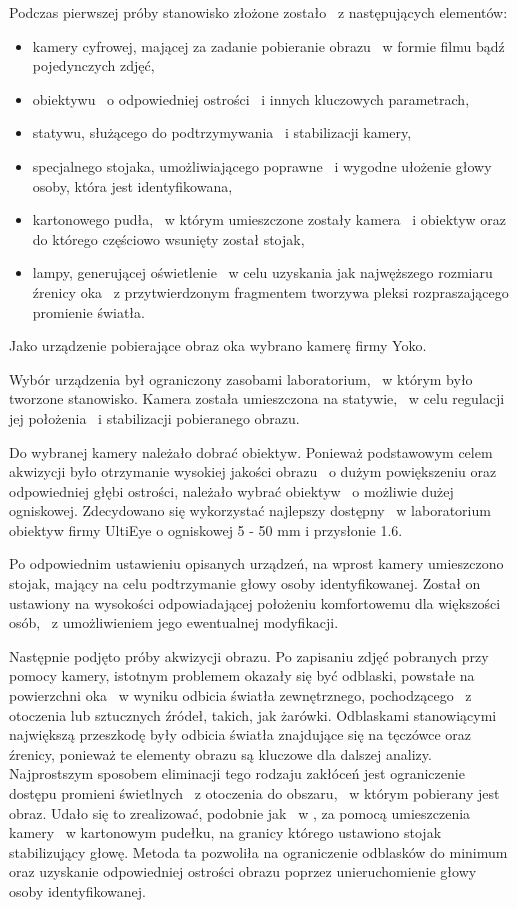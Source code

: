 Podczas pierwszej próby stanowisko złożone zostało ~z następujących elementów:
\begin{itemize}
 \item kamery cyfrowej, mającej za zadanie pobieranie obrazu ~w formie filmu bądź pojedynczych zdjęć,
 \item obiektywu ~o odpowiedniej ostrości ~i innych kluczowych parametrach,
 \item statywu, służącego do podtrzymywania ~i stabilizacji kamery,
 \item specjalnego stojaka, umożliwiającego poprawne ~i wygodne ułożenie głowy osoby, która jest identyfikowana,
 \item kartonowego pudła, ~w którym umieszczone zostały kamera ~i obiektyw oraz do którego częściowo wsunięty został stojak,
 \item lampy, generującej oświetlenie ~w celu uzyskania jak najwęższego rozmiaru źrenicy oka ~z przytwierdzonym fragmentem tworzywa pleksi rozpraszającego promienie światła.
 \end{itemize}

Jako urządzenie pobierające obraz oka wybrano kamerę firmy Yoko.

Wybór urządzenia był ograniczony zasobami laboratorium, ~w którym było tworzone stanowisko. Kamera została umieszczona na statywie, ~w celu regulacji jej położenia ~i stabilizacji pobieranego obrazu.

Do wybranej kamery należało dobrać obiektyw. Ponieważ podstawowym celem akwizycji było otrzymanie wysokiej jakości obrazu ~o dużym powiększeniu oraz odpowiedniej głębi ostrości, należało wybrać obiektyw ~o możliwie dużej ogniskowej. Zdecydowano się wykorzystać najlepszy dostępny ~w laboratorium obiektyw firmy UltiEye o ogniskowej 5 - 50 mm i przysłonie 1.6.

Po odpowiednim ustawieniu opisanych urządzeń, na wprost kamery umieszczono stojak, mający na celu podtrzymanie głowy osoby identyfikowanej. Został on ustawiony na wysokości odpowiadającej położeniu komfortowemu dla większości osób, ~z umożliwieniem jego ewentualnej modyfikacji.

Następnie podjęto próby akwizycji obrazu. Po zapisaniu zdjęć pobranych przy pomocy kamery, istotnym problemem okazały się być odblaski, powstałe na powierzchni oka ~w wyniku odbicia światła zewnętrznego, pochodzącego ~z otoczenia lub sztucznych źródeł, takich, jak żarówki. Odblaskami stanowiącymi największą przeszkodę były odbicia światła znajdujące się na tęczówce oraz źrenicy, ponieważ te elementy obrazu są kluczowe dla dalszej analizy. Najprostszym sposobem eliminacji tego rodzaju zakłóceń jest ograniczenie dostępu promieni świetlnych ~z otoczenia do obszaru, ~w którym pobierany jest obraz. Udało się to zrealizować, podobnie jak ~w \cite{Gl11}, za pomocą umieszczenia kamery ~w kartonowym pudełku, na granicy którego ustawiono stojak stabilizujący głowę. Metoda ta pozwoliła na ograniczenie odblasków do minimum oraz uzyskanie odpowiedniej ostrości obrazu poprzez unieruchomienie głowy osoby identyfikowanej.

